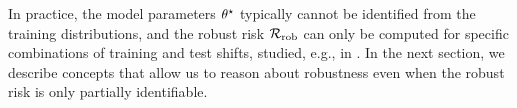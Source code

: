In practice, the model parameters $\theta^{\star}$ typically cannot be identified from the training distributions,
and the robust risk $\mathcal{R}_{\mathrm{rob}}$ can only be computed for specific combinations of training and test shifts, studied, e.g., in \citep{rothenhausler2021anchor,shen2023causalityoriented}. In the next section, we describe concepts that allow us to 
reason about robustness even when the robust risk is only partially identifiable. 




